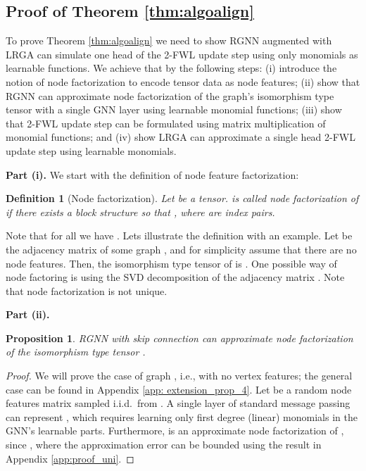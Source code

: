 \documentclass{article} \usepackage{iclr2021_conference,times}
\newcommand{\ie}{{i.e.}}
\newtheorem{proposition}{Proposition}
\newtheorem{definition}{Definition}
\begin{document}
\subsection{Proof of Theorem \ref{thm:algoalign}}

To prove Theorem \ref{thm:algoalign} we need to show RGNN augmented with LRGA can simulate one head of the 2-FWL update step using only monomials as learnable functions. We achieve that by the following steps: (i) introduce the notion of node factorization to encode  tensor data as node features; (ii) show that RGNN can approximate node factorization of the graph's isomorphism type tensor with a single GNN layer using learnable monomial functions; (iii) show that 2-FWL update step can be formulated using matrix multiplication of monomial functions; and (iv) show LRGA can approximate a single head 2-FWL update step using learnable monomials. 

\textbf{Part (i).} 
We start with the definition of node feature factorization:
\begin{definition}[Node factorization] \label{def:richfeat}
Let  be a tensor.  is called \emph{node factorization} of  if there exists a block structure  so that , where  are index pairs.  \end{definition}
Note that for all  we have .
Lets illustrate the definition with an example. Let  be the adjacency matrix of some graph , and for simplicity assume that there are no node features. Then, the isomorphism type tensor of  is . One possible way of node factoring  is using the SVD decomposition of the adjacency matrix . Note that node factorization is not unique. 


\textbf{Part (ii).}
\begin{proposition}\label{prop: rich_to_random}
RGNN with skip connection can approximate node factorization of the  isomorphism type tensor .
\end{proposition}
\begin{proof}
We will prove the case of graph , \ie, with no vertex features; the general case can be found in Appendix \ref{app: extension_prop_4}. Let   be a random node features matrix sampled i.i.d.~from . 
A single layer of standard message passing can represent , which requires learning only first degree (linear) monomials in the GNN's learnable parts.  Furthermore,  is an approximate node factorization of , since , where the approximation error  can be bounded using the result in Appendix \ref{app:proof_uni}.
\end{proof}
\end{document}
